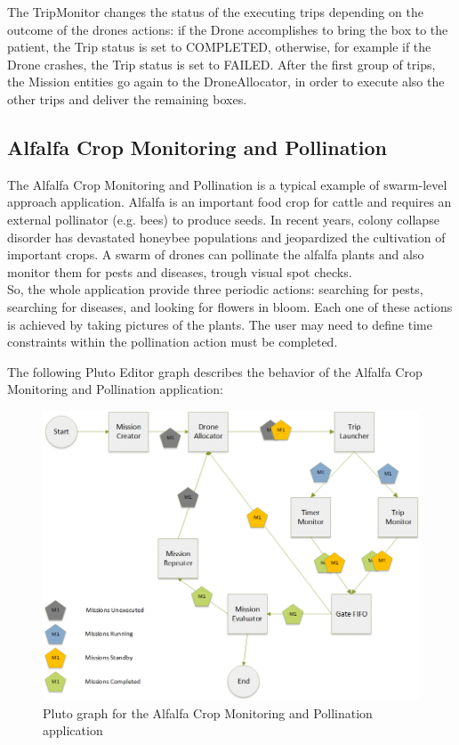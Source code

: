 The TripMonitor changes the status of the executing trips depending on the outcome of the drones actions:
if the Drone accomplishes to bring the box to the patient, the Trip status is set to COMPLETED, otherwise, for example if the Drone crashes, the Trip status is set to FAILED.
After the first group of trips, the Mission entities go again to the DroneAllocator, in order to execute also the other trips and deliver the remaining boxes.

\newpage

\subsection{Alfalfa Crop Monitoring and Pollination}\label{alfalfa}

The Alfalfa Crop Monitoring and Pollination\cite{alfalfa} is a typical example of swarm-level approach application.
Alfalfa is an important food crop for cattle and requires an external pollinator (e.g. bees) to produce seeds. In recent years, colony collapse disorder has devastated honeybee populations and jeopardized the cultivation of important crops\cite{colony}.
A swarm of drones can pollinate the alfalfa plants and also monitor them for pests and diseases, trough visual spot checks.
\\
So, the whole application provide three periodic actions: searching for pests, searching for diseases, and looking for flowers in bloom.
Each one of these actions is achieved by taking pictures of the plants.
The user may need to define time constraints within the pollination action must be completed.

The following Pluto Editor graph describes the behavior of the Alfalfa Crop Monitoring and Pollination\cite{alfalfa} application:

\begin{figure}[H]
  \centering
  \includegraphics[width=\linewidth]{pictures/Alfalfa_Diagram.png}
  \caption{Pluto graph for the Alfalfa Crop Monitoring and Pollination application}
  \label{fig:alfalfaGraph}
\end{figure}

